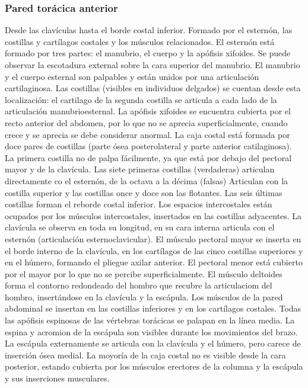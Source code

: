 \documentclass[a4paper,12pt]{article} %
\begin{document}
\begin{appendices}
\subsubsection{Pared torácica anterior}
Desde las clavículas hasta el borde costal inferior. Formado por el esternón, las costillas y cartílagos costales y los músculos relacionados.
El esternón está formado por tres partes: el manubrio, el cuerpo y la apófisis xifoides. Se puede observar la escotadura external sobre la cara superior del manubrio. El manubrio y el cuerpo esternal son palpables y están unidos por una articulación cartilaginosa. Las costillas (visibles en individuos delgados) se cuentan desde esta localización: el cartilago de la segunda costilla se articula a cada lado de la articulación manubrioesternal. La apófisis xifoides se encuentra cubierta por el recto anterior del abdomen, por lo que no se aprecia superficialmente, cuando crece y se aprecia se debe considerar anormal.
La caja costal está formada por doce pares de costillas (parte ósea posterolateral y parte anterior catilaginosa). La primera costilla no de palpa fácilmente, ya que está por debajo del pectoral mayor y de la clavícula. Las siete primeras costillas (verdaderas) articulan directamente co el esternón, de la octava a la décima (falsas) Articulan con la costilla superior y las costillas once y doce son las flotantes. Las seis últimas costillas forman el reborde costal inferior. Los espacios intercostales están ocupados por los músculos intercostales, insertados en las costillas adyacentes.
La clavícula se observa en toda su longitud, en su cara interna articula con  el esternón (articulación esternoclavicular).
El músculo pectoral mayor se inserta en el borde interno de la clavícula, en los cartílagos de las cinco costillas superiores y en el húmero, formando el pliegue axilar anterior. El pectoral menor está cubierto por el mayor por lo que no se percibe superficialmente.
El músculo deltoides forma el contorno redondeado del hombro que recubre la articulaciom del hombro, insertándose en la clavícula y la escápula.
Los músculos de la pared abdominal se insertan en las costillas inferiores y en los cartílagos costales.
Todas las apófisis espinosas de las vértebras torácicas se palapan en la línea media. La espina y acromion de la escápula son visibles durante los movimientos del brazo. La escápula externamente se articula con la clavícula y el húmero, pero carece de inserción ósea medial. La moyoría de la caja costal no es visible desde la cara posterior, estando cubierta por los músculos erectores de la columna y la escápula y sus inserciones musculares.


\end{appendices}
\end{document}
